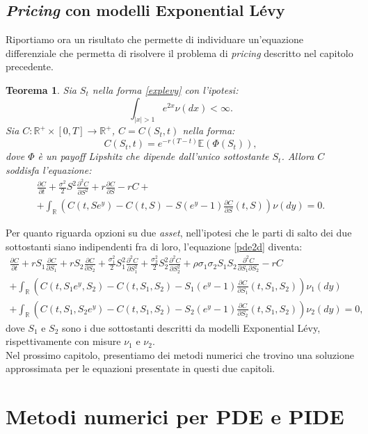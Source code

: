 \documentclass[a4paper,10pt]{report}
\newcommand{\der}[2]{\frac{\partial #1}{\partial #2}}
\newcommand{\dder}[2]{\frac{\partial^2 #1}{\partial #2^2}}
\newcommand{\dmix}[3]{\frac{\partial^2 #1}{\partial #2 \partial #3}}
\theoremstyle{plain}
\newtheorem{theorem}{Teorema}[chapter]
\theoremstyle{definition}
\theoremstyle{remark}
\begin{document}
\section{\emph{Pricing} con modelli Exponential L\'evy}
Riportiamo ora un risultato che permette di individuare un'equazione differenziale che permetta di risolvere il problema di \emph{pricing} descritto nel capitolo precedente.
\begin{theorem}
Sia $S_t$ nella forma \ref{explevy} con l'ipotesi: $$\int_{|x|>1} e^{2x}\nu(dx)<\infty.$$ Sia $C:\mathbb{R}^+\times[0,T]\rightarrow\mathbb{R}^+$, $C=C(S_t,t)$ nella forma: $$C(S_t,t)=e^{-r(T-t)}\mathbb{E}(\Phi(S_t)),$$ dove $\Phi$ \`e un \emph{payoff Lipshitz} che dipende dall'unico sottostante $S_t$. Allora $C$ soddisfa l'equazione:
\begin{multline}
\der{C}{t}+\frac{\sigma^2}{2}S^2\dder{C}{S}+r\der{C}{S}-rC+\\+ \int_\mathbb{R}\left(C(t,Se^y)-C(t,S)-S(e^y-1)\der{C}{S}(t,S)\right)\nu(dy)=0.
\end{multline}
\end{theorem}
Per quanto riguarda opzioni su due \emph{asset}, nell'ipotesi che le parti di salto dei due sottostanti siano indipendenti fra di loro, l'equazione \ref{pde2d} diventa:
\begin{multline}
\der{C}{t}+rS_1\der{C}{S_1}+rS_2\der{C}{S_2}+\frac{\sigma^2_1}{2}S_1^2\dder{C}{S_1}+\frac{\sigma^2_2}{2}S_2^2\dder{C}{S_2}+\rho\sigma_1\sigma_2S_1S_2\dmix{C}{S_1}{S_2}-rC\\+\int_\mathbb{R}\left(C(t,S_1e^y,S_2)-C(t,S_1,S_2)-S_1(e^y-1)\der{C}{S_1}(t,S_1,S_2)\right)\nu_1(dy)\\+\int_\mathbb{R}\left(C(t,S_1,S_2e^y)-C(t,S_1,S_2)-S_2(e^y-1)\der{C}{S_2}(t,S_1,S_2)\right)\nu_2(dy)=0,
\label{pide2d}
\end{multline}
dove $S_1$ e $S_2$ sono i due sottostanti descritti da modelli Exponential L\'evy, rispettivamente con misure $\nu_1$ e $\nu_2$.\\Nel prossimo capitolo, presentiamo dei metodi numerici che trovino una soluzione approssimata per le equazioni presentate in questi due capitoli.

\chapter{Metodi numerici per PDE e PIDE}
\end{document}
